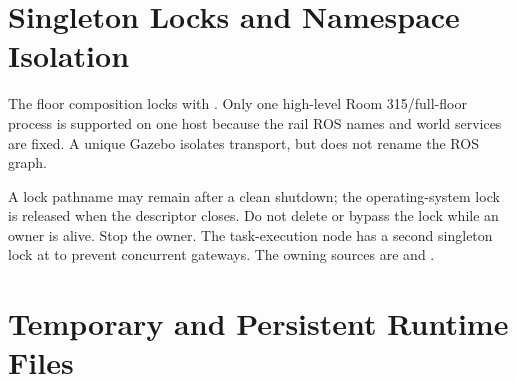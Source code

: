 \section{Singleton Locks and Namespace Isolation}

The floor composition locks
 with . Only one
high-level Room 315/full-floor process is supported on one host because the rail
ROS names and world services are fixed. A unique Gazebo 
isolates transport, but does not rename the ROS graph.

A lock pathname may remain after a clean shutdown; the operating-system lock is
released when the descriptor closes. Do not delete or bypass the lock while an
owner is alive. Stop the owner. The task-execution node has a second singleton
lock at  to prevent concurrent
gateways. The owning sources are
 and
.

\section{Temporary and Persistent Runtime Files}

